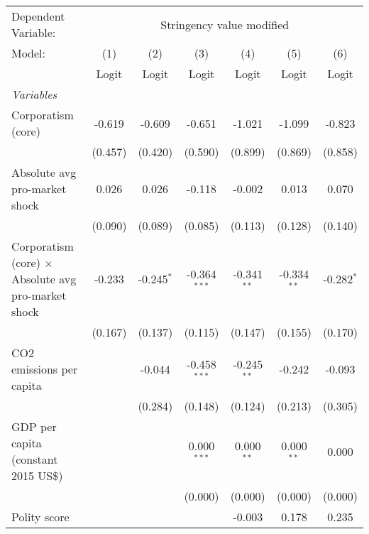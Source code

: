 
\begingroup
\centering
\begin{tabular}{lcccccc}
   \toprule
   Dependent Variable: & \multicolumn{6}{c}{Stringency value modified}\\
   Model:                                                     & (1)     & (2)          & (3)            & (4)           & (5)           & (6)\\  
                                                              &  Logit  & Logit        & Logit          & Logit         & Logit         & Logit\\  
   \midrule
   \emph{Variables}\\
   Corporatism (core)                                         & -0.619  & -0.609       & -0.651         & -1.021        & -1.099        & -0.823\\   
                                                              & (0.457) & (0.420)      & (0.590)        & (0.899)       & (0.869)       & (0.858)\\   
   Absolute avg pro-market shock                              & 0.026   & 0.026        & -0.118         & -0.002        & 0.013         & 0.070\\   
                                                              & (0.090) & (0.089)      & (0.085)        & (0.113)       & (0.128)       & (0.140)\\   
   Corporatism (core) $\times$ Absolute avg pro-market shock  & -0.233  & -0.245$^{*}$ & -0.364$^{***}$ & -0.341$^{**}$ & -0.334$^{**}$ & -0.282$^{*}$\\   
                                                              & (0.167) & (0.137)      & (0.115)        & (0.147)       & (0.155)       & (0.170)\\   
   CO2 emissions per capita                                   &         & -0.044       & -0.458$^{***}$ & -0.245$^{**}$ & -0.242        & -0.093\\   
                                                              &         & (0.284)      & (0.148)        & (0.124)       & (0.213)       & (0.305)\\   
   GDP per capita (constant 2015 US\$)                        &         &              & 0.000$^{***}$  & 0.000$^{**}$  & 0.000$^{**}$  & 0.000\\   
                                                              &         &              & (0.000)        & (0.000)       & (0.000)       & (0.000)\\   
   Polity score                                               &         &              &                & -0.003        & 0.178         & 0.235\\   

\end{tabular}
